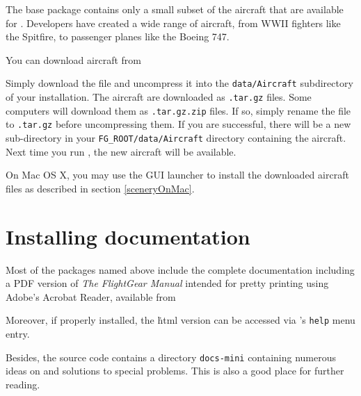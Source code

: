 The base \FlightGear{} package contains only a small subset of the aircraft that are available for \FlightGear{}.
Developers have created a wide range of aircraft, from WWII fighters like the Spitfire, to passenger planes like the Boeing 747.

You can download aircraft from

\medskip
{}
\medskip

Simply download the file and uncompress it into the
\texttt{data/Aircraft} subdirectory of your installation. The
aircraft are downloaded as \texttt{.tar.gz} files. Some computers will download
them as \texttt{.tar.gz.zip} files. If so, simply rename the file to
\texttt{.tar.gz} before uncompressing them. If you are successful, there will be a new
sub-directory in your \texttt{FG\_ROOT/data/Aircraft} directory containing the
aircraft. Next time you run \FlightGear{}, the new aircraft will be available. 

On Mac OS X, you may use the GUI launcher to install the downloaded aircraft files as described in section \ref{sceneryOnMac}.
 

\section{Installing documentation}

Most of the packages named above include the complete \FlightGear{}
documentation including a PDF version of \textit{The FlightGear
Manual} intended for pretty printing using Adobe's Acrobat Reader,
available from
\medskip

 \medskip

 \noindent
 Moreover, if properly installed, the \.html version can be accessed via
\FlightGear{}'s \texttt{help} menu entry.

Besides, the source code contains a directory \texttt{docs-mini} containing numerous
ideas on and solutions to special problems. This is also a good place for further
reading.

